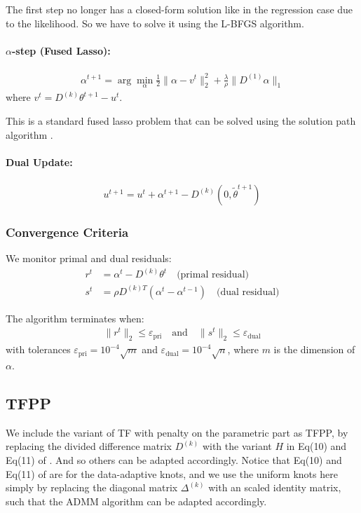 The first step no longer has a closed-form solution like in the regression case \citet{ramdas2016fast} due to the likelihood. So we have to solve it using the L-BFGS algorithm.

\paragraph{$\alpha$-step (Fused Lasso):}
\begin{align*}
\alpha^{t+1} = \arg\min_\alpha \frac{1}{2} \|\alpha - v^t\|_2^2 + \frac{\lambda}{\rho} \|D^{(1)} \alpha\|_1
\end{align*}
where $v^t = D^{(k)} \theta^{t+1} - u^t$.

This is a standard fused lasso problem that can be solved using the solution path algorithm \citep{tibshirani2011solution}.

\paragraph{Dual Update:}
\begin{align*}
u^{t+1} = u^t + \alpha^{t+1} - D^{(k)} (0, \tilde\theta^{t+1})
\end{align*}

\subsubsection{Convergence Criteria}

We monitor primal and dual residuals:
\begin{align*}
r^t &= \alpha^t - D^{(k)} \theta^t \quad \text{(primal residual)} \\
s^t &= \rho D^{(k)T} (\alpha^t - \alpha^{t-1}) \quad \text{(dual residual)}
\end{align*}

The algorithm terminates when:
\begin{align*}
\|r^t\|_2 \leq \varepsilon_{\text{pri}} \quad \text{and} \quad \|s^t\|_2 \leq \varepsilon_{\text{dual}}
\end{align*}
with tolerances $\varepsilon_{\text{pri}} = 10^{-4} \sqrt{m}$ and $\varepsilon_{\text{dual}} = 10^{-4} \sqrt{n}$, where $m$ is the dimension of $\alpha$.

\subsection{TFPP} \label{subsec:tfpp}
We include the variant of TF with penalty on the parametric part as TFPP, by replacing the divided difference matrix $D^{(k)}$ with the variant $H$ in Eq(10) and Eq(11) of \citet{wang2014falling}. And so others can be adapted accordingly. Notice that Eq(10) and Eq(11) of \citet{wang2014falling} are for the data-adaptive knots, and we use the uniform knots here simply by replacing the diagonal matrix $\Delta^{(k)}$ with an scaled identity matrix, such that the ADMM algorithm can be adapted accordingly.

